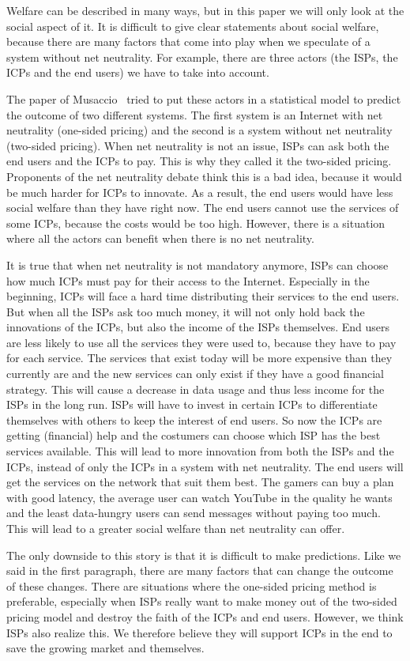 Welfare can be described in many ways, but in this paper we will only look at the social aspect of it. It is difficult to give clear statements about social welfare, because there are many factors that come into play when we speculate of a system without net neutrality. For example, there are three actors (the \acp{ISP}, the \acp{ICP} and the end users) we have to take into account.

The paper of Musaccio~\cite{musacchio2009} tried to put these actors in a statistical model to predict the outcome of two different systems. The first system is an Internet with net neutrality (one-sided pricing) and the second is a system without net neutrality (two-sided pricing). When net neutrality is not an issue, \acp{ISP} can ask both the end users and the \acp{ICP} to pay. This is why they called it the two-sided pricing. Proponents of the net neutrality debate think this is a bad idea, because it would be much harder for \acp{ICP} to innovate. As a result, the end users would have less social welfare than they have right now. The end users cannot use the services of some \acp{ICP}, because the costs would be too high. However, there is a situation where all the actors can benefit when there is no net neutrality.

It is true that when net neutrality is not mandatory anymore, \acp{ISP} can choose how much \acp{ICP} must pay for their access to the Internet. Especially in the beginning, \acp{ICP} will face a hard time distributing their services to the end users. But when all the \acp{ISP} ask too much money, it will not only hold back the innovations of the \acp{ICP}, but also the income of the \acp{ISP} themselves. End users are less likely to use all the services they were used to, because they have to pay for each service. The services that exist today will be more expensive than they currently are and the new services can only exist if they have a good financial strategy. This will cause a decrease in data usage and thus less income for the \acp{ISP} in the long run. \acp{ISP} will have to invest in certain \acp{ICP} to differentiate themselves with others to keep the interest of end users. So now the \acp{ICP} are getting (financial) help and the costumers can choose which \ac{ISP} has the best services available. This will lead to more innovation from both the \acp{ISP} and the \acp{ICP}, instead of only the \acp{ICP} in a system with net neutrality. The end users will get the services on the network that suit them best. The gamers can buy a plan with good latency, the average user can watch YouTube in the quality he wants and the least data-hungry users can send messages without paying too much. This will lead to a greater social welfare than net neutrality can offer.

The only downside to this story is that it is difficult to make predictions. Like we said in the first paragraph, there are many factors that can change the outcome of these changes. There are situations where the one-sided pricing method is preferable, especially when \acp{ISP} really want to make money out of the two-sided pricing model and destroy the faith of the \acp{ICP} and end users. However, we think \acp{ISP} also realize this. We therefore believe they will support \acp{ICP} in the end to save the growing market and themselves.
